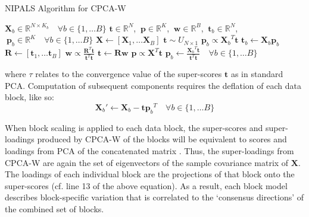 \begin{algorithm}[H]
\caption{NIPALS Algorithm for CPCA-W}
\label{algorithm.3.4}
\begin{algorithmic}[1]
\REQUIRE $\mathbf{X}_b \in \mathbb{R}^{N \times K_b}
          \quad \forall b \in \{1, \dots B\}$
\ENSURE $\mathbf{t} \in \mathbb{R}^N$,%
      $\:\mathbf{p} \in \mathbb{R}^K$,%
      $\:\mathbf{w} \in \mathbb{R}^B$,%
      $\:\mathbf{t}_b \in \mathbb{R}^N$,%
      $\:\mathbf{p}_b \in \mathbb{R}^K \quad \forall b \in \{1, \dots B\}$
\STATE $\mathbf{X} \gets
        [\mathbf{X}_1, \dots \mathbf{X}_B]$
\STATE $\mathbf{t} \sim U_{N \times 1}$ 
\REPEAT
    \STATE $\mathbf{p}_b \propto {\mathbf{X}_b}^T \mathbf{t}$
    \STATE $\mathbf{t}_b \gets \mathbf{X}_b \mathbf{p}_b$
  \ENDFOR
  \STATE $\mathbf{R} \gets [\mathbf{t}_1, \dots \mathbf{t}_B]$
  \STATE $\mathbf{w} \propto \tfrac{\mathbf{R}^T \mathbf{t}}
                                   {\mathbf{t}^T \mathbf{t}}$
  \STATE $\mathbf{t} \gets \mathbf{R} \mathbf{w}$
\UNTIL{$\tau < \varepsilon$}
\STATE $\mathbf{p} \propto \mathbf{X}^T \mathbf{t}$
\STATE $\mathbf{p}_b \gets \tfrac{{\mathbf{X}_b}^T \mathbf{t}}
                                 {\mathbf{t}^T \mathbf{t}}
        \quad \forall b \in \{1, \dots B\}$
\end{algorithmic}
\end{algorithm}

\begin{doublespace}
where $\tau$ relates to the convergence value of the super-scores
$\mathbf{t}$ as in standard PCA. Computation of subsequent components requires
the deflation of each data block, like so:
\begin{equation}
\mathbf{X}_b' \gets \mathbf{X}_b - \mathbf{t} {\mathbf{p}_b}^T
 \quad \forall b \in \{1, \dots B\}
\end{equation}

When block scaling is applied to each data block, the super-scores and
super-loadings produced by CPCA-W of the blocks will be equivalent to scores
and loadings from PCA of the concatenated matrix
\cite{westerhuis:jchemo1998,smilde:jchemo2003}. Thus, the super-loadings
from CPCA-W are again the set of eigenvectors of the sample covariance matrix
of $\mathbf{X}$. The loadings of each individual block are the projections of
that block onto the super-scores (cf. line 13 of the above equation). As a
result, each block model describes block-specific variation that is correlated
to the `consensus directions' of the combined set of blocks.
\end{doublespace}

